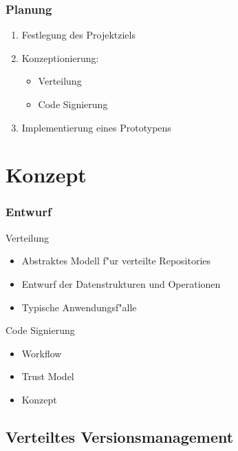 \documentclass[german]{beamer}
\begin{document}
\begin{frame}
  \frametitle{Planung}
  \begin{enumerate}
  \item Festlegung des Projektziels
  \item Konzeptionierung:
    \begin{itemize}
    \item Verteilung
    \item Code Signierung
    \end{itemize}
  \item Implementierung eines Prototypens
  \end{enumerate}
\end{frame}

\section{Konzept}

\begin{frame}
  \frametitle{Entwurf}
  \begin{block}{Verteilung}
    \begin{itemize}
    \item Abstraktes Modell f"ur verteilte Repositories
    \item Entwurf der Datenstrukturen und Operationen
    \item Typische Anwendungsf"alle
    \end{itemize}
  \end{block}
  \begin{block}{Code Signierung}
    \begin{itemize}
    \item Workflow
    \item Trust Model
    \item Konzept
    \end{itemize}
  \end{block}
\end{frame}

\subsection{Verteiltes Versionsmanagement}
\newcommand{\STRUCT}[1]{\ensuremath{\mathnormal{#1}}}
\newcommand{\NORMAL}[1]{\ensuremath{\mbox{\textnormal{#1}}}}
\def\APPEND{:\mathrel\cdot}
\end{document}
